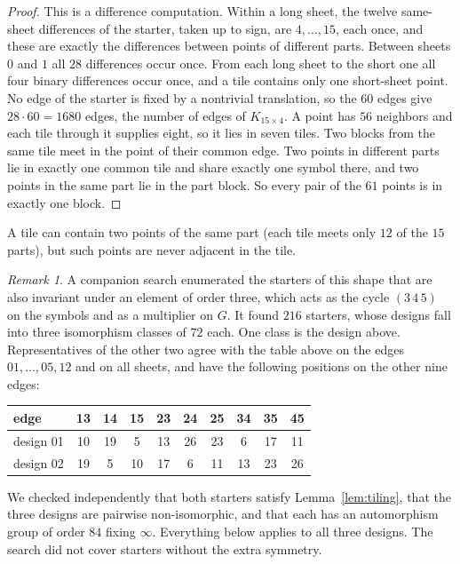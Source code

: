 \documentclass[11pt]{amsart}
\theoremstyle{remark}
\newtheorem{remark}[theorem]{Remark}
\begin{document}
\begin{proof}
This is a difference computation. Within a long sheet, the twelve same-sheet differences of the starter, taken up to sign, are $4,\dots,15$, each once, and these are exactly the differences between points of different parts. Between sheets $0$ and $1$ all $28$ differences occur once. From each long sheet to the short one all four binary differences occur once, and a tile contains only one short-sheet point. No edge of the starter is fixed by a nontrivial translation, so the $60$ edges give $28\cdot60=1680$ edges, the number of edges of $K_{15\times4}$. A point has $56$ neighbors and each tile through it supplies eight, so it lies in seven tiles. Two blocks from the same tile meet in the point of their common edge. Two points in different parts lie in exactly one common tile and share exactly one symbol there, and two points in the same part lie in the part block. So every pair of the $61$ points is in exactly one block.
\end{proof}

A tile can contain two points of the same part (each tile meets only $12$ of the $15$ parts), but such points are never adjacent in the tile.

\begin{remark}\label{rem:starters}
A companion search enumerated the starters of this shape that are also invariant under an element of order three, which acts as the cycle $(3\,4\,5)$ on the symbols and as a multiplier on $G$. It found $216$ starters, whose designs fall into three isomorphism classes of $72$ each. One class is the design above. Representatives of the other two agree with the table above on the edges $01,\dots,05,12$ and on all sheets, and have the following positions on the other nine edges:
\begin{center}\small
\begin{tabular}{@{}l*{9}{c}@{}}
\toprule
edge & 13&14&15&23&24&25&34&35&45\\
\midrule
design 01 & 10&19&5&13&26&23&6&17&11\\
design 02 & 19&5&10&17&6&11&13&23&26\\
\bottomrule
\end{tabular}
\end{center}
We checked independently that both starters satisfy Lemma~\ref{lem:tiling}, that the three designs are pairwise non-isomorphic, and that each has an automorphism group of order $84$ fixing $\infty$. Everything below applies to all three designs. The search did not cover starters without the extra symmetry.
\end{remark}
\end{document}
